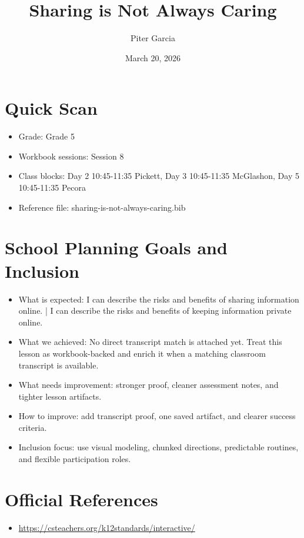 \documentclass[11pt]{article}
\title{Sharing is Not Always Caring}
\author{Piter Garcia}
\date{March 20, 2026}
\begin{document}
\maketitle
\section*{Quick Scan}
\begin{itemize}[leftmargin=*]
\item Grade: Grade 5
\item Workbook sessions: Session 8
\item Class blocks: Day 2 10:45-11:35 Pickett, Day 3 10:45-11:35 McGlashon, Day 5 10:45-11:35 Pecora
\item Reference file: sharing-is-not-always-caring.bib
\end{itemize}
\section*{School Planning Goals and Inclusion}
\begin{itemize}[leftmargin=*]
\item What is expected: I can describe the risks and benefits of sharing information online. | I can describe the risks and benefits of keeping information private online.
\item What we achieved: No direct transcript match is attached yet. Treat this lesson as workbook-backed and enrich it when a matching classroom transcript is available.
\item What needs improvement: stronger proof, cleaner assessment notes, and tighter lesson artifacts.
\item How to improve: add transcript proof, one saved artifact, and clearer success criteria.
\item Inclusion focus: use visual modeling, chunked directions, predictable routines, and flexible participation roles.
\end{itemize}
\section*{Official References}
\begin{itemize}[leftmargin=*]
\item \url{https://csteachers.org/k12standards/interactive/}

\end{itemize}
\end{document}
